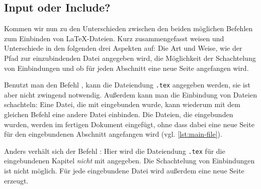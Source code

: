 \subsection{Input oder Include?}
\label{subsec:input-vs-include}
Kommen wir nun zu den Unterschieden zwischen den beiden möglichen Befehlen zum Einbinden von \LaTeX-Dateien. Kurz zusammengefasst weisen \texttt{} und \texttt{} Unterschiede in den folgenden drei Aspekten auf: Die Art und Weise, wie der Pfad zur einzubindenden Datei angegeben wird, die Möglichkeit der Schachtelung von Einbindungen und ob für jeden Abschnitt eine neue Seite angefangen wird.
 
Benutzt man den Befehl \texttt{}, kann die Dateiendung \texttt{.tex} angegeben werden, sie ist aber nicht zwingend notwendig. Außerdem kann man die Einbindung von Dateien schachteln: Eine Datei, die mit \texttt{} eingebunden wurde, kann wiederum mit dem gleichen Befehl eine andere Datei einbinden. Die Dateien, die eingebunden wurden, werden im fertigen Dokument eingefügt, ohne dass dabei eine neue Seite für den eingebundenen Abschnitt angefangen wird (vgl. \cref{lst:main-file}).
 
Anders verhält sich der Befehl \texttt{}: Hier wird die Dateiendung \texttt{.tex} für die eingebundenen Kapitel \emph{nicht} mit angegeben. Die Schachtelung von Einbindungen ist nicht möglich. Für jede eingebundene Datei wird außerdem eine neue Seite erzeugt. 